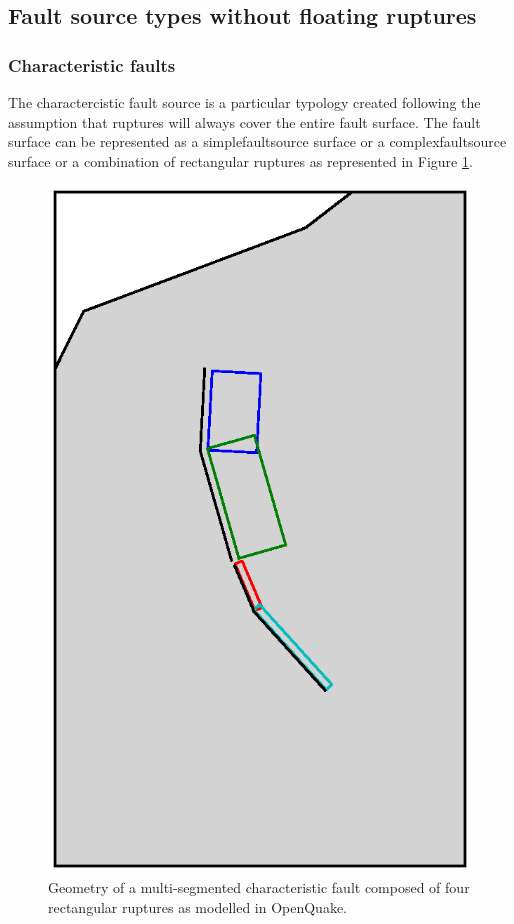 \subsection{Fault source types without floating ruptures}
\subsubsection{Characteristic faults}
The charactercistic fault source is a particular typology created following 
the assumption that ruptures will always cover the entire fault surface. 
%
The fault surface can be represented as a \gls{simplefaultsource} surface 
or a \gls{complexfaultsource} surface or a combination of rectangular ruptures
as represented in Figure \ref{fig:char_fault_source}.
\begin{figure}[!ht]
\centering
\includegraphics[width=15cm]{./figures/hazard/multi_surface.ps}
\caption{Geometry of a multi-segmented characteristic fault composed of four
	rectangular ruptures as modelled in OpenQuake.}
\label{fig:char_fault_source}
\end{figure}
